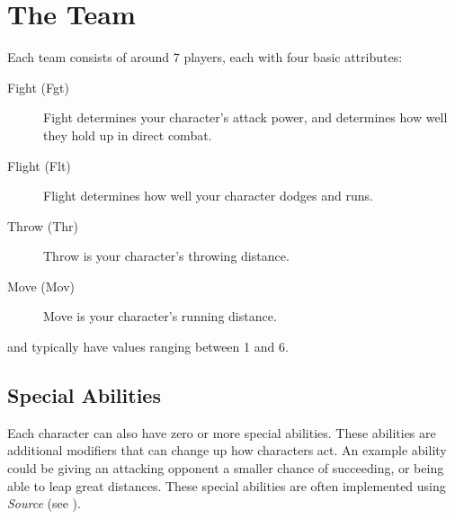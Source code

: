 \section{The Team} \label{the-team}
Each team consists of around 7 players, each with four basic attributes:

\begin{description}
    \item[Fight (Fgt)] Fight determines your character's attack power, and determines how well they hold up in direct combat.
    \item[Flight (Flt)] Flight determines how well your character dodges and runs.
    \item[Throw (Thr)] Throw is your character's throwing distance.
    \item[Move (Mov)] Move is your character's running distance.
\end{description}

\fight{} and \flight{} typically have values ranging between 1 and 6.

\subsection{Special Abilities}
Each character can also have zero or more special abilities.
These abilities are additional modifiers that can change up how characters act.
An example ability could be giving an attacking opponent a smaller chance of succeeding, or being able to leap great distances.
These special abilities are often implemented using \textit{Source} (see ).
